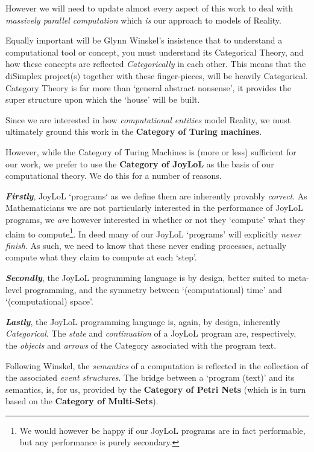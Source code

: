 However we will need to update almost every aspect of this work to deal with
\emph{massively parallel computation} which \emph{is} our approach to models of
Reality.

Equally important will be Glynn Winskel's insistence that to understand a
computational tool or concept, you must understand its Categorical Theory, and
how these concepts are reflected \emph{Categorically} in each other. This means
that the diSimplex project(s) together with these finger-pieces, will be heavily
Categorical. Category Theory is far more than `general abstract nonsense', it
provides the super structure upon which the `house' will be built.


Since we are interested in how \emph{computational entities} model Reality, we
must ultimately ground this work in the \textbf{Category of Turing machines}.

However, while the Category of Turing Machines is (more or less) sufficient for
our work, we prefer to use the \textbf{Category of JoyLoL} as the basis of our
computational theory. We do this for a number of reasons.

\textbf{\textit{Firstly}}, JoyLoL `programs` as we define them are inherently
provably \emph{correct}. As Mathematicians we are not particularly interested
in the performance of JoyLoL programs, we \emph{are} however interested in
whether or not they `compute' what they claim to compute\footnote{We would
however be happy if our JoyLoL programs are in fact performable, but any
performance is purely secondary.}. In deed many of our JoyLoL `programs' will
explicitly \emph{never finish}. As such, we need to know that these never ending
processes, actually compute what they claim to compute at each `step'.

\textbf{\textit{Secondly}}, the JoyLoL programming language is by design, better
suited to meta-level programming, and the symmetry between `(computational)
time' and `(computational) space'.

\textbf{\textit{Lastly}}, the JoyLoL programming language is, again, by design,
inherently \emph{Categorical}. The \emph{state} and \emph{continuation} of a
JoyLoL program are, respectively, the \emph{objects} and \emph{arrows} of the
Category associated with the program text.

Following Winskel, the \emph{semantics} of a computation is reflected in the
collection of the associated \emph{event structures}. The bridge between a
`program (text)' and its semantics, is, for us, provided by the \textbf{Category
of Petri Nets} (which is in turn based on the \textbf{Category of Multi-Sets}).

